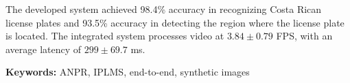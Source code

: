 The developed system achieved 98.4\% accuracy in recognizing Costa Rican license plates
and 93.5\% accuracy in detecting the region where the license plate is located.
The integrated system processes video at $3.84\pm 0.79$ FPS, with an average latency of $299\pm 69.7$ ms.

\bigskip

\textbf{Keywords:} ANPR, IPLMS, end-to-end, synthetic images

\cleardoublepage


